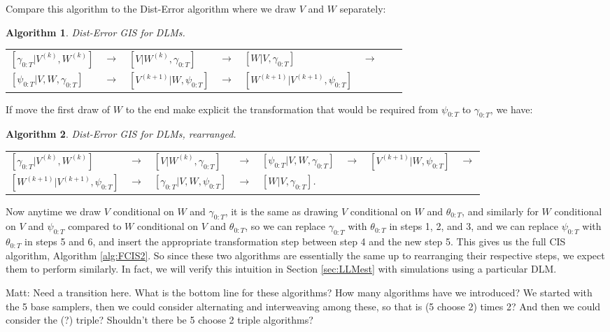 \documentclass{article}
\newtheorem{alg}{Algorithm}
\newcommand{\matt}[1]{{\color{red} Matt: #1}}
\begin{document}
Compare this algorithm to the Dist-Error algorithm where we draw $V$ and $W$ separately:
\begin{alg}Dist-Error GIS for DLMs.\label{alg:Dist-Error}\\
  \begin{center}
    \begin{tabular}{llllllll}
      $[\gamma_{0:T}|V^{(k)},W^{(k)}]$& $\to $& $[V|W^{(k)},\gamma_{0:T}]$& $\to$& $[W|V,\gamma_{0:T}]$& $\to$\\
      $[\psi_{0:T}|V,W,\gamma_{0:T}]$& $\to$& $[V^{(k+1)}|W,\psi_{0:T}]$& $\to$& $[W^{(k+1)}|V^{(k+1)},\psi_{0:T}]$&
    \end{tabular}
  \end{center}
\end{alg}
\noindent If move the first draw of $W$ to the end make explicit the transformation that would be required from $\psi_{0:T}$ to $\gamma_{0:T}$, we have:
\begin{alg}Dist-Error GIS for DLMs, rearranged.\label{alg:Dist-Error2}\\
  \begin{center}
    \begin{tabular}{llllllll}
      $[\gamma_{0:T}|V^{(k)},W^{(k)}]$& $\to $& $[V|W^{(k)},\gamma_{0:T}]$& $\to$& $[\psi_{0:T}|V,W,\gamma_{0:T}]$& $\to$& $[V^{(k+1)}|W,\psi_{0:T}]$& $\to$\\
      $[W^{(k+1)}|V^{(k+1)},\psi_{0:T}]$& $\to$& $[\gamma_{0:T}|V,W,\psi_{0:T}]$&$\to$& $[W|V,\gamma_{0:T}]$.&&&
    \end{tabular}
  \end{center}
\end{alg}
\noindent Now anytime we draw $V$ conditional on $W$ and $\gamma_{0:T}$, it is the same as drawing $V$ conditional on $W$ and $\theta_{0:T}$, and similarly for $W$ conditional on $V$ and $\psi_{0:T}$ compared to $W$ conditional on $V$ and $\theta_{0:T}$, so we can replace $\gamma_{0:T}$ with $\theta_{0:T}$ in steps 1, 2, and 3, and we can replace $\psi_{0:T}$ with $\theta_{0:T}$ in steps 5 and 6, and insert the appropriate transformation step between step 4 and the new step 5. This gives us the full CIS algorithm, Algorithm \ref{alg:FCIS2}. So since these two algorithms are essentially the same up to rearranging their respective steps, we expect them to perform similarly. In fact, we will verify this intuition in Section \ref{sec:LLMest} with simulations using a particular DLM.

\matt{Need a transition here. What is the bottom line for these algorithms? How many algorithms have we introduced? We started with the 5 base samplers, then we could consider alternating and interweaving among these, so that is (5 choose 2) times 2? And then we could consider the (?) triple? Shouldn't there be 5 choose 2 triple algorithms?}


\clearpage


\end{document}
